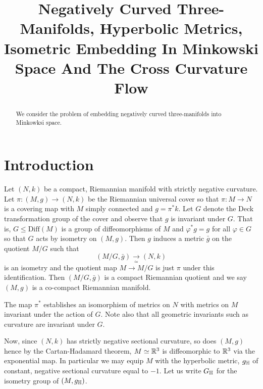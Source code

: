 \documentclass[a4paper, 12pt]{amsart}
\begin{document}
\title[Negatively Curved Three Manifolds]{Negatively Curved Three-Manifolds, Hyperbolic Metrics, Isometric Embedding In Minkowski Space And The Cross Curvature Flow}

\date{}

\dedicatory{}

\begin{abstract}
We consider the problem of embedding negatively curved three-manifolds into Minkowksi space.
\end{abstract}

\maketitle

\section{Introduction}
\label{sec:intro}
Let \((N, k)\) be a compact, Riemannian manifold with strictly negative curvature. Let \(\pi\colon (M, g) \to (N, k)\) be the Riemannian universal cover so that \(\pi : M \to N\) is a covering map with \(M\) simply connected and \(g = \pi^{\ast} k\). Let \(G\) denote the Deck transformation group of the cover and observe that \(g\) is invariant under \(G\). That is, \(G \leq \text{Diff}(M)\) is a group of diffeomorphisms of \(M\) and \(\varphi^{\ast} g = g\) for all \(\varphi \in G\) so that \(G\) acts by isometry on \((M, g)\). Then \(g\) induces a metric \(\bar{g}\) on the quotient \(M/G\) such that
\[
(M/G, \bar{g}) \underset{\simeq}{\to} (N, k)
\]
is an isometry
and the quotient map \(M \to M/G\) is just \(\pi\) under this identification. Then \((M/G, \bar{g})\) is a compact Riemannian quotient and we say \((M, g)\) is a co-compact Riemannian manifold.
\begin{rem}
The map \(\pi^{\ast}\) establishes an isomorphism of metrics on \(N\) with metrics on \(M\) invariant under the action of \(G\). Note also that all geometric invariants such as curvature are invariant under \(G\).
\end{rem}
Now, since \((N, k)\) has strictly negative sectional curvature, so does \((M, g)\) hence by the Cartan-Hadamard theorem, \(M \simeq \mathbb{R}^3\) is diffeomorphic to \(\mathbb{R}^3\) via the exponential map. In particular we may equip \(M\) with the hyperbolic metric, \(g_{\mathbb{H}}\) of constant, negative sectional curvature equal to \(-1\). Let us write \(G_{\mathbb{H}}\) for the isometry group of \((M, g_{\mathbb{H}})\).
\end{document}
